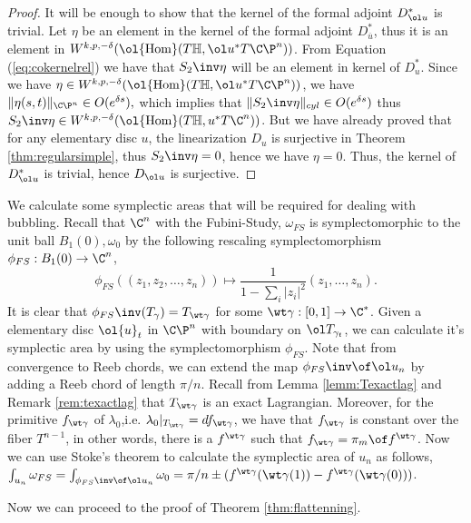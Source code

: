\begin{proof}
It will be enough to show that the kernel of the formal adjoint $D^*_{\ol u}$ is trivial.  Let $\eta$ be an element in the kernel of the formal adjoint $D^*_{\overline{u}}$, thus it is an element in $W^{k,p,-\delta} (\ol {\operatorname{Hom}} (T\mathbb{H},\ol u ^* T\C\P^n )) $. From Equation (\ref{eq:cokernelrel}) we have that $S_2\inv \eta$ will be an element in kernel of $D_u^*$. Since we have $\eta \in W^{k,p,-\delta} (\ol {\operatorname{Hom}} (T\mathbb{H},\ol u ^* T\C\P^n )) $, we have $\| \eta(s,t) \|_{\C\P^n} \in O(e^{\delta s}),$ which implies that $\| S_2\inv \eta \|_{cyl} \in O(e^{\delta s}) $ thus $S_2\inv \eta \in W^{k,p,-\delta} (\ol {\operatorname{Hom}} (T\mathbb{H}, u ^* T\C^n ))$. But we have already proved that for any elementary disc $u$, the linearization $D_u$ is surjective in Theorem \ref{thm:regularsimple}, thus $S_2\inv \eta = 0$, hence we have $\eta = 0 $. Thus, the kernel of $D^*_{\ol u}$ is trivial, hence $D_{\ol u}$ is surjective.


 
\end{proof}
\begin{remark} \label{rem:PrepSurj}
We calculate some symplectic areas that will be required for dealing with bubbling.  Recall that $\C^n$ with the Fubini-Study, $\omega_{FS}$ is symplectomorphic to the unit ball $B_1(0),\omega_0$ by the following rescaling symplectomorphism $\phi_{FS} : B_1(0) \to \C^n$, $$\phi_{FS} ((z_1,z_2,\dots,z_n)) \mapsto \frac{1}{1-\sum_i |z_i|^2} (z_1,\dots,z_n).$$ It is clear that $\phi_{FS} \inv (T_\gamma)=T_{\wt \gamma}$ for some $\wt \gamma : [0,1] \to \C^*$.  Given a elementary disc $\ol{u}_t$ in $\C\P^n$ with boundary on $\ol T_{\gamma_t}$, we can calculate it's symplectic area by using the symplectomorphism $\phi_{FS}$. Note that from convergence to Reeb chords, we can extend the map $\phi_{FS}\inv \of \ol u_n$ by adding a Reeb chord of length $\pi/n$. Recall from Lemma \ref{lemm:Texactlag} and Remark \ref{rem:texactlag} that $T_{\wt \gamma}$ is an exact Lagrangian. Moreover, for the primitive $f_{\wt \gamma}$ of $\lambda_0$,i.e. $\lambda_0|_{T_{\wt \gamma}} = df_{\wt \gamma}$, we have that $f_{\wt \gamma}$ is constant over the fiber $T^{n-1}$, in other words, there is a $f^{\wt \gamma}$ such that $f_{\wt \gamma} = \pi_m \of f^{\wt \gamma} $. Now we can use Stoke's theorem to calculate the symplectic area of $u_n$ as follows,
$ \int_{u_n} \omega_{FS}= \int_{\phi_{FS}\inv \of \ol u_n} \omega_0 = \pi/n \pm ( f^{\wt \gamma}(\wt \gamma (1)) - f^{\wt \gamma}(\wt \gamma (0)))$.


\end{remark}
\noindent Now we can proceed to the proof of Theorem \ref{thm:flattenning}.

